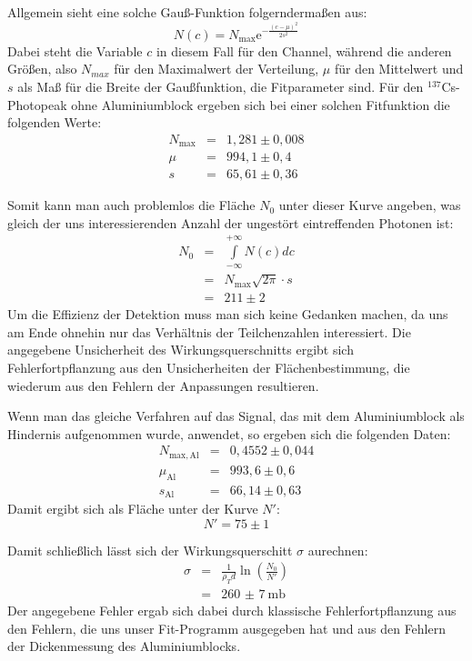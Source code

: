 Allgemein sieht eine solche Gauß-Funktion folgerndermaßen aus:
\begin{equation}
  N(c) = N_{\mathrm{max}}\mathrm e^{-\frac{(c-\mu)^2}{2s^2}}
\end{equation}
Dabei steht die Variable $c$ in diesem Fall für den Channel, während die
anderen Größen, also $N_{max}$ für den Maximalwert der Verteilung, $\mu$ für den
Mittelwert und $s$ als Maß für die Breite der Gaußfunktion, die Fitparameter
sind. Für den $^{137}$Cs-Photopeak ohne Aluminiumblock ergeben sich bei einer
solchen Fitfunktion die folgenden Werte:
\begin{eqnarray}
N_{\mathrm{max}} &=& 1,281 \pm 0,008\\
\mu &=& 994,1 \pm 0,4\\
s &=& 65,61 \pm 0,36
\end{eqnarray}

Somit kann man auch problemlos die Fläche $N_0$ unter dieser Kurve
angeben, was gleich der uns interessierenden Anzahl der ungestört eintreffenden
Photonen ist:
\begin{eqnarray}
N_0 &=& \int\limits_{-\infty}^{+\infty}N(c)dc\\
&=& N_{\mathrm{max}}\sqrt{2\pi}\cdot s\\
\nonumber &=& 211 \pm 2
\end{eqnarray}
Um die Effizienz der Detektion muss man sich keine Gedanken machen, da uns am
Ende ohnehin nur das Verhältnis der Teilchenzahlen interessiert.
Die angegebene Unsicherheit des Wirkungsquerschnitts ergibt sich Fehlerfortpflanzung
aus den Unsicherheiten der Flächenbestimmung, die wiederum aus den Fehlern der
Anpassungen resultieren.

Wenn man das gleiche Verfahren auf das Signal, das mit dem Aluminiumblock als
Hindernis aufgenommen wurde, anwendet, so ergeben sich die folgenden Daten:
\begin{eqnarray}
N_{\mathrm{max, Al}} &=& 0,4552 \pm 0,044\\
\mu_{\mathrm{Al}} &=& 993,6 \pm 0,6\\
s_{\mathrm{Al}} &=& 66,14 \pm 0,63
\end{eqnarray}
Damit ergibt sich als Fläche unter der Kurve $N'$:
\begin{equation}
N' = 75 \pm 1
\end{equation}

Damit schließlich lässt sich der Wirkungsquerschitt $\sigma$ aurechnen:
\begin{eqnarray}
\sigma &=& \frac{1}{\rho_T d}\ln\left(\frac{N_0}{N'}\right)\\
\nonumber &=& \SI{260(7)}{\milli\barn}
\end{eqnarray}
Der angegebene Fehler ergab sich dabei durch klassische Fehlerfortpflanzung
aus den Fehlern, die uns unser Fit-Programm ausgegeben hat und aus den Fehlern der
Dickenmessung des Aluminiumblocks.

